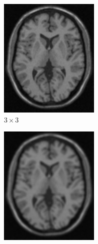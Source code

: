 \documentclass[11pt,twocolumn,twoside]{opticajnl}
\begin{document}
\begin{figure}[h]
\begin{subfigure}[h]{0.24\linewidth}
            \includegraphics[width=\textwidth]{Figuras/ImagenA3x3.png}
            \caption{\centering $3\times3$} 
         \end{subfigure}
         \begin{subfigure}[h]{0.24\linewidth}
            \centering
            \includegraphics[width=\textwidth]{Figuras/ImagenA5x5.png}

\end{subfigure}
\end{figure}
\end{document}
